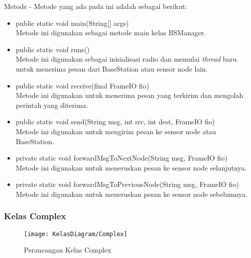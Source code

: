 Metode - Metode yang ada pada ini adalah sebagai berikut:
\begin{itemize}
	\item public static void main(String[] args) \\
		Metode ini digunakan sebagai metode main kelas BSManager.
	\item public static void runs()\\
		Metode ini digunakan sebagai inisialisasi radio dan memulai {\it thread} baru untuk menerima pesan dari BaseStation atau sensor node lain.
	\item public static void receive(final FrameIO fio) \\
		Metode ini digunakan untuk menerima pesan yang terkirim dan mengolah perintah yang diterima.
	\item public static void send(String msg, int src, int dest, FrameIO fio) \\
		Metode ini digunakan untuk mengirim pesan ke sensor node atau BaseStation.
	\item private static void forwardMsgToNextNode(String msg, FrameIO fio) \\
		Metode ini digunakan untuk meneruskan pesan ke sensor node selanjutnya.
	\item private static void forwardMsgToPreviousNode(String msg, FrameIO fio) \\
		Metode ini digunakan untuk meneruskan pesan ke sensor node sebelumnya.
\end{itemize}

\subsubsection{Kelas Complex}
\begin{figure}[H]
	\centering
	\texttt{[image: KelasDiagram/Complex]}  
	\caption[Perancangan Kelas Complex]{Perancangan Kelas Complex} 
	\label{fig:KelasComplex} 
\end{figure}

